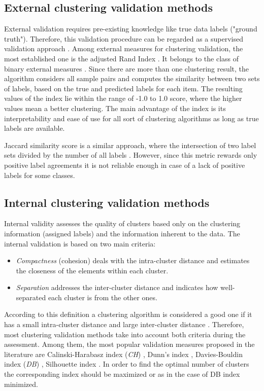 \documentclass[fontsize=12pt,a4paper,twoside,openany]{scrbook}
\begin{document}
\subsection{External clustering validation methods}
External validation requires pre-existing knowledge like true data labels ("ground truth"). Therefore, this validation procedure can be regarded as a supervised validation approach \parencite{Palacio19}. Among external measures for clustering validation, the most established one is the adjusted Rand Index \parencite{Hubert85}. It belongs to the class of binary external measures \parencite{Handl05}. Since there are more than one clustering result, the algorithm considers all sample pairs and computes the similarity between two sets of labels, based on the true and predicted labels for each item. The resulting values of the index lie within the range of -1.0 to 1.0 score, where the higher values mean a better clustering. The main advantage of the index is its interpretability and ease of use for all sort of clustering algorithms as long as true labels are available. 

Jaccard similarity score is a similar approach, where the intersection of two label sets divided by the number of all labels \parencite{Arnaboldi15}. However, since this metric rewards only positive label agreements \parencite{Handl05} it is not reliable enough in case of a lack of positive labels for some classes.

\subsection{Internal clustering validation methods}
Internal validity assesses the quality of clusters based only on the clustering information (assigned labels) and the information inherent to the data. The internal validation is based on two main criteria:
\begin{itemize}
  \item \emph{Compactness} (cohesion) deals with the intra-cluster distance and estimates the closeness of the elements within each cluster.
  \item \emph{Separation} addresses the inter-cluster distance and indicates how well-separated each cluster is from the other ones.
\end{itemize}
According to this definition a clustering algorithm is considered a good one if it has a small intra-cluster distance and large inter-cluster distance \parencite{Kim05}. Therefore, most clustering validation methods take into account both criteria during the assessment. Among them, the most popular validation measures proposed in the literature are Calinski-Harabasz index (\emph{CH}) \parencite{Calinski74}, Dunn's index \parencite{Dunn74}, Davies-Bouldin index (\emph{DB}) \parencite{DaviesB79}, Silhouette index \parencite{Rousseeuw87}. In order to find the optimal number of clusters the corresponding index should be maximized or as in the case of DB index minimized.
\end{document}
